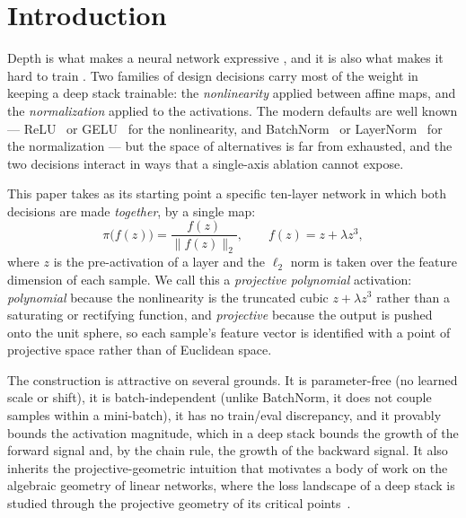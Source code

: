 \section{Introduction}
\label{sec:intro}

Depth is what makes a neural network expressive
\citep{hornik1989multilayer,cybenko1989approximation,mhaskar2017deep,telgarsky2016benefits},
and it is also what makes it hard to train
\citep{glorot2010understanding,he2015delving,poole2016exponential,schoenholz2017deep}.
Two families of design decisions carry most of the weight in
keeping a deep stack trainable: the \emph{nonlinearity} applied between affine
maps, and the \emph{normalization} applied to the activations. The modern
defaults are well known --- ReLU~\citep{glorot2011deep,maas2013rectifier} or
GELU~\citep{hendrycks2016gaussian} for the nonlinearity, and
BatchNorm~\citep{ioffe2015batch} or LayerNorm~\citep{ba2016layer} for the
normalization --- but the space of alternatives is far from
exhausted, and the two decisions interact in ways that a single-axis ablation
cannot expose.

This paper takes as its starting point a specific ten-layer network in which
both decisions are made \emph{together}, by a single map:
\begin{equation}
\pi\bigl(f(z)\bigr) = \frac{f(z)}{\lVert f(z)\rVert_2},
\qquad
f(z) = z + \lambda z^{3},
\label{eq:projective-poly}
\end{equation}
where $z$ is the pre-activation of a layer and the $\ell_2$ norm is taken over
the feature dimension of each sample. We call this a \emph{projective
polynomial} activation: \emph{polynomial} because the nonlinearity is the
truncated cubic $z + \lambda z^3$ rather than a saturating or
rectifying function, and \emph{projective} because the output is pushed onto
the unit sphere, so each sample's feature vector is identified with a point of
projective space rather than of Euclidean space.

The construction is attractive on several grounds. It is
parameter-free (no learned scale or shift), it is batch-independent (unlike
BatchNorm, it does not couple samples within a mini-batch), it has no
train/eval discrepancy, and it provably bounds the activation magnitude,
which in a deep stack bounds the growth of the forward signal and, by the
chain rule, the growth of the backward signal. It also inherits the
projective-geometric intuition that motivates a body of work on the algebraic
geometry of linear networks, where the loss landscape of a deep stack is
studied through the projective geometry of its critical
points~\citep{xiuyi2021landscape,saxe2014exact,dauphin2014identifying}.

